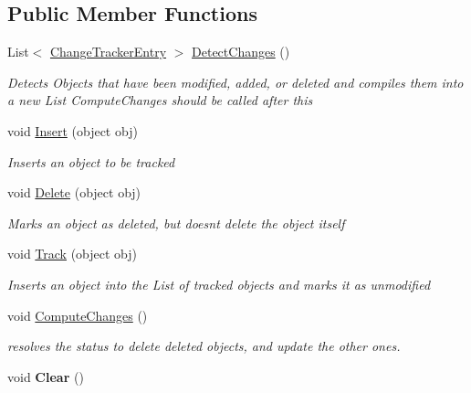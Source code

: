 \subsection*{Public Member Functions}
\begin{DoxyCompactItemize}
\item 
List$<$ \mbox{\hyperlink{class_linq_1_1_change_tracker_entry}{Change\+Tracker\+Entry}} $>$ \mbox{\hyperlink{class_linq_1_1_change_tracker_a2e57cf68dc70deca33a3a9e5e7aa9184}{Detect\+Changes}} ()
\begin{DoxyCompactList}\small\item\em Detects Objects that have been modified, added, or deleted and compiles them into a new List Compute\+Changes should be called after this \end{DoxyCompactList}\item 
void \mbox{\hyperlink{class_linq_1_1_change_tracker_aa53380f4a4352608f221ea918815d7c1}{Insert}} (object obj)
\begin{DoxyCompactList}\small\item\em Inserts an object to be tracked \end{DoxyCompactList}\item 
void \mbox{\hyperlink{class_linq_1_1_change_tracker_a6d14dc387040af11f769e348a98e77f9}{Delete}} (object obj)
\begin{DoxyCompactList}\small\item\em Marks an object as deleted, but doesn\textquotesingle{}t delete the object itself \end{DoxyCompactList}\item 
void \mbox{\hyperlink{class_linq_1_1_change_tracker_ab0d470a3095ae5a0a7ae80fbfdcf614b}{Track}} (object obj)
\begin{DoxyCompactList}\small\item\em Inserts an object into the List of tracked objects and marks it as unmodified \end{DoxyCompactList}\item 
void \mbox{\hyperlink{class_linq_1_1_change_tracker_a8274e4dca2ddc943c748deaca6e6a0a0}{Compute\+Changes}} ()
\begin{DoxyCompactList}\small\item\em resolves the status to delete deleted objects, and update the other ones. \end{DoxyCompactList}\item 
\mbox{\label{class_linq_1_1_change_tracker_a45301c9a0a9e32e1183039375b3957bd}} 
void {\bfseries Clear} ()
\end{DoxyCompactItemize}


